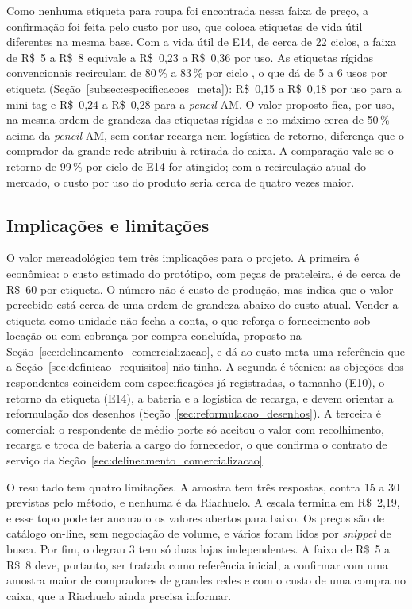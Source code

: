Como nenhuma etiqueta para roupa foi encontrada nessa faixa de preço, a confirmação foi feita pelo custo por uso, que coloca etiquetas de vida útil diferentes na mesma base. Com a vida útil de E14, de cerca de 22 ciclos, a faixa de R\$~5 a R\$~8 equivale a R\$~0,23 a R\$~0,36 por uso. As etiquetas rígidas convencionais recirculam de 80\,\% a 83\,\% por ciclo \cite{sensormatic2024recirculacao,pact2026etiquetas}, o que dá de 5 a 6 usos por etiqueta (Seção~\ref{subsec:especificacoes_meta}): R\$~0,15 a R\$~0,18 por uso para a mini tag e R\$~0,24 a R\$~0,28 para a \textit{pencil} AM. O valor proposto fica, por uso, na mesma ordem de grandeza das etiquetas rígidas e no máximo cerca de 50\,\% acima da \textit{pencil} AM, sem contar recarga nem logística de retorno, diferença que o comprador da grande rede atribuiu à retirada do caixa. A comparação vale se o retorno de 99\,\% por ciclo de E14 for atingido; com a recirculação atual do mercado, o custo por uso do produto seria cerca de quatro vezes maior.

\subsection{Implicações e limitações}
\label{subsec:escala_implicacoes}

O valor mercadológico tem três implicações para o projeto. A primeira é econômica: o custo estimado do protótipo, com peças de prateleira, é de cerca de R\$~60 por etiqueta. O número não é custo de produção, mas indica que o valor percebido está cerca de uma ordem de grandeza abaixo do custo atual. Vender a etiqueta como unidade não fecha a conta, o que reforça o fornecimento sob locação ou com cobrança por compra concluída, proposto na Seção~\ref{sec:delineamento_comercializacao}, e dá ao custo-meta uma referência que a Seção~\ref{sec:definicao_requisitos} não tinha. A segunda é técnica: as objeções dos respondentes coincidem com especificações já registradas, o tamanho (E10), o retorno da etiqueta (E14), a bateria e a logística de recarga, e devem orientar a reformulação dos desenhos (Seção~\ref{sec:reformulacao_desenhos}). A terceira é comercial: o respondente de médio porte só aceitou o valor com recolhimento, recarga e troca de bateria a cargo do fornecedor, o que confirma o contrato de serviço da Seção~\ref{sec:delineamento_comercializacao}.

O resultado tem quatro limitações. A amostra tem três respostas, contra 15 a 30 previstas pelo método, e nenhuma é da Riachuelo. A escala termina em R\$~2,19, e esse topo pode ter ancorado os valores abertos para baixo. Os preços são de catálogo on-line, sem negociação de volume, e vários foram lidos por \textit{snippet} de busca. Por fim, o degrau 3 tem só duas lojas independentes. A faixa de R\$~5 a R\$~8 deve, portanto, ser tratada como referência inicial, a confirmar com uma amostra maior de compradores de grandes redes e com o custo de uma compra no caixa, que a Riachuelo ainda precisa informar.
